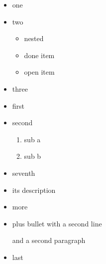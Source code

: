 \begin{itemize}
\item one
\item two
\begin{itemize}
\item nested
\item[{$\boxtimes$}] done item
\item[{$\square$}] open item
\end{itemize}
\item three

\item first
\item second
\begin{enumerate}
\item sub a
\item sub b
\end{enumerate}
\setcounter{enumi}{6}
\item seventh

\item[{term}] its description
\item[{another term}] more

\item plus bullet
with a second line

and a second paragraph
\item last
\end{itemize}
